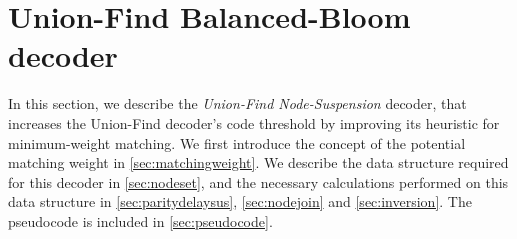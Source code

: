 \section{Union-Find Balanced-Bloom decoder}\label{sec:ufbb}

In this section, we describe the \emph{Union-Find Node-Suspension} decoder, that increases the Union-Find decoder's code threshold by improving its heuristic for minimum-weight matching. We first introduce the concept of the potential matching weight in \ref{sec:matchingweight}. We describe the data structure required for this decoder in \ref{sec:nodeset}, and the necessary calculations performed on this data structure in \ref{sec:paritydelaysus}, \ref{sec:nodejoin} and \ref{sec:inversion}. The pseudocode is included in \ref{sec:pseudocode}. 